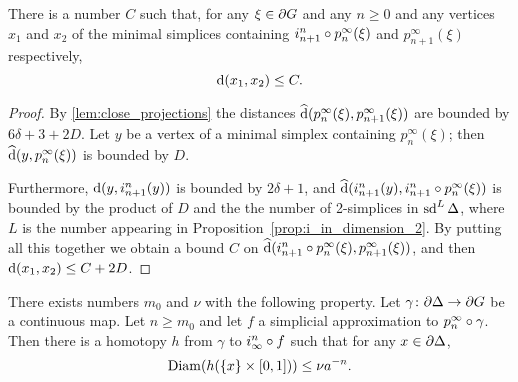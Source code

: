 \documentclass[a4paper]{article}
\begin{document}
\begin{lemma}\label{lem:name_this}
  There is a number $C$ such that, for any $\xi \in \partial G$ and any $n
  \geq 0$ and any vertices $x_1$ and $x_2$ of the minimal simplices containing
  $i^n_{n+1}\circ p^\infty_n(\xi)$ and $p^\infty_{n+1}(\xi)$ respectively,
  \begin{equation*}
    \operatorname{d}(x_1, x_2) \leq C.
  \end{equation*}
\end{lemma}

\begin{proof}
  By \cref{lem:close_projections} the distances $\operatorname{\widehat{d}}(p^\infty_n(\xi),
  p^\infty_{n+1}(\xi))$ are bounded by $6\delta + 3 + 2D$. Let $y$ be a vertex
  of a minimal simplex containing $p^\infty_n(\xi)$; then $\operatorname{\widehat{d}}(y,
  p^\infty_n(\xi))$ is bounded by $D$.
  
  Furthermore, $\operatorname{d}(y, i^n_{n+1}(y))$ is bounded by $2\delta+1$, and
  $\operatorname{\widehat{d}}(i^n_{n+1}(y), i^n_{n+1}\circ p^\infty_n (\xi))$ is bounded by
  the product of $D$ and the the number of 2-simplices in $\operatorname{sd}^L\Delta$, where
  $L$ is the number appearing in Proposition~\ref{prop:i_in_dimension_2}.  By
  putting all this together we obtain a bound $C$ on
  $\operatorname{\widehat{d}}(i^n_{n+1}\circ p^\infty_n(\xi), p^\infty_{n+1}(\xi))$, and then
  $\operatorname{d}(x_1, x_2) \leq C + 2D$.
\end{proof}

\begin{proposition}\label{prop:uniform_homotopies}
  There exists numbers $m_0$ and $\nu$ with the following property. Let
  $\gamma\colon\partial\Delta\to\partial G$ be a continuous map. Let $n \geq
  m_0$ and let $f$ a simplicial approximation to $p^\infty_n\circ\gamma$.
  Then there is a homotopy $h$ from $\gamma$ to $i^n_\infty\circ f$ such
  that for any $x \in \partial\Delta$,
  \begin{equation*}
    \operatorname{Diam}(h(\{x\}\times [0,1])) \leq \nu a^{-n}.
  \end{equation*}
\end{proposition}
\end{document}
